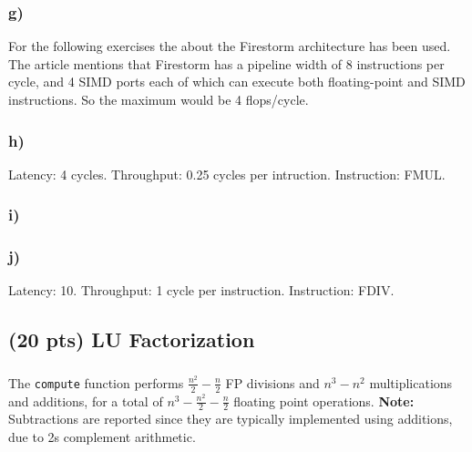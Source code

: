 \documentclass[tikz,14pt,fleqn]{article}
\begin{document}
\subsubsection*{g)}
For the following exercises the  about the Firestorm architecture has been used. The article mentions that Firestorm has a pipeline width of 8 instructions per cycle, and 4 SIMD ports each of which can execute both floating-point and SIMD instructions. So the maximum would be 4 flops/cycle.
\subsubsection*{h)}
Latency: 4 cycles. Throughput: 0.25 cycles per intruction. Instruction: FMUL. 
\subsubsection*{i)}

\subsubsection*{j)}
Latency: 10. Throughput: 1 cycle per instruction. Instruction: FDIV.


\subsection{(20 pts) LU Factorization}
\subsubsection{} %

\subsubsection{} %
The \texttt{compute} function performs $\frac{n^2}{2}-\frac{n}{2}$ FP divisions and $n^3-n^2$ multiplications and additions, for a total of $n^3-\frac{n^2}{2}-\frac{n}{2}$ floating point operations. \textbf{Note:} Subtractions are reported since they are typically implemented using additions, due to 2s complement arithmetic.
\end{document}
